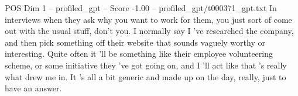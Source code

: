 \begin{textsample}{POS Dim 1 – profiled\_gpt – Score -1.00 – profiled\_gpt/t000371\_gpt.txt}  \label{ex:f1_pos_035}
In interviews when they ask why you want to work for them, you just sort of come out with the usual stuff, don't you.
I normally say I ’ve researched the company, and then pick something off their website that sounds vaguely worthy or interesting.
Quite often it ’ll be something like their employee volunteering scheme, or some initiative they ’ve got going on, and I ’ll act like that ’s really what drew me in.
It ’s all a bit generic and made up on the day, really, just to have an answer.

\end{textsample}
